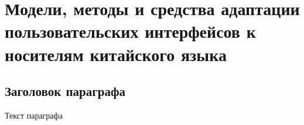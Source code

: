 
\chapter{Модели, методы и средства адаптации пользовательских интерфейсов к носителям китайского языка}
\label{chapter_chinese_interfaces}


\section{Заголовок параграфа}
Текст параграфа

%